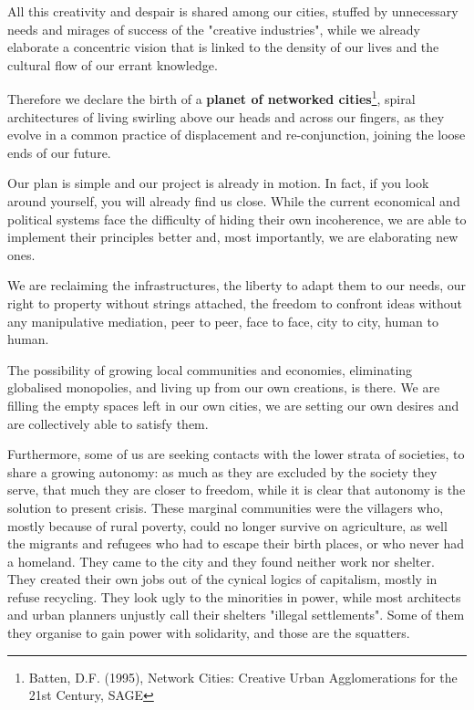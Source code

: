 All this creativity and despair is shared among our cities, stuf\hbox{}fed by
unnecessary needs and mirages of success of the "creative industries", while we
already elaborate a concentric vision that is linked to the density of our lives
and the cultural f\hbox{}low of our errant knowledge.

Therefore we declare the birth of a \textbf{planet of networked
cities}\footnote{Batten, D.F. (1995), Network Cities: Creative Urban
Agglomerations for the 21st Century, SAGE}, spiral architectures of living
swirling above our heads and across our f\hbox{}ingers, as they evolve in a
common practice of displacement and re-conjunction, joining the loose ends of
our future.

Our plan is simple and our project is already in motion. In fact, if you look
around yourself, you will already f\hbox{}ind us close. While the current
economical and political systems face the dif\hbox{}f\hbox{}iculty of hiding
their own incoherence, we are able to implement their principles better and,
most importantly, we are elaborating new ones.

We are reclaiming the infrastructures, the liberty to adapt them to our needs,
our right to property without strings attached, the freedom to confront ideas
without any manipulative mediation, peer to peer, face to face, city to city,
human to human.

The possibility of growing local communities and economies, eliminating
globalised monopolies, and living up from our own creations, is there. We are
f\hbox{}illing the empty spaces left in our own cities, we are setting our own
desires and are collectively able to satisfy them.

Furthermore, some of us are seeking contacts with the lower strata of societies,
to share a growing autonomy: as much as they are excluded by the society they
serve, that much they are closer to freedom, while it is clear that autonomy is
the solution to present crisis. These marginal communities were the villagers
who, mostly because of rural poverty, could no longer survive on agriculture, as
well the migrants and refugees who had to escape their birth places, or who
never had a homeland. They came to the city and they found neither work nor
shelter. They created their own jobs out of the cynical logics of capitalism,
mostly in refuse recycling. They look ugly to the minorities in power, while
most architects and urban planners unjustly call their shelters "illegal
settlements". Some of them they organise to gain power with solidarity, and
those are the squatters.

